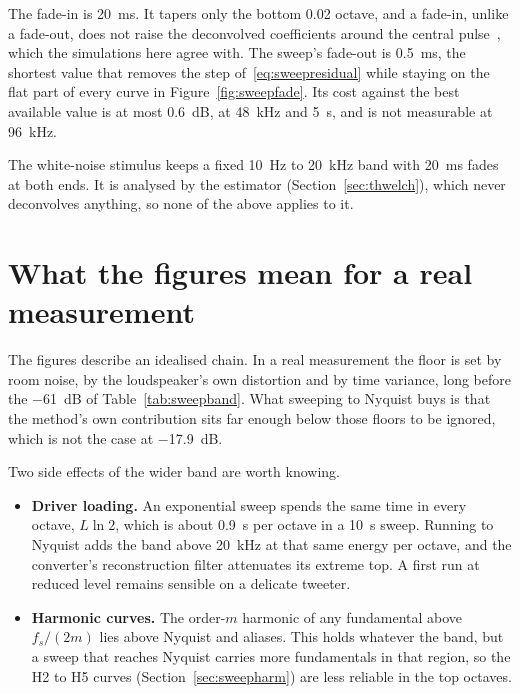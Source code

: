 The fade-in is \SI{20}{\milli\second}. It tapers only the bottom \num{0.02} octave, and a fade-in, unlike a fade-out, does not raise the deconvolved coefficients around the central pulse~\cite{Vetter2011}, which the simulations here agree with. The sweep's fade-out is \SI{0.5}{\milli\second}, the shortest value that removes the step of~\eqref{eq:sweepresidual} while staying on the flat part of every curve in Figure~\ref{fig:sweepfade}. Its cost against the best available value is at most \SI{0.6}{\dB}, at \SI{48}{\kilo\hertz} and \SI{5}{\second}, and is not measurable at \SI{96}{\kilo\hertz}.

The white-noise stimulus keeps a fixed \SI{10}{\hertz} to \SI{20}{\kilo\hertz} band with \SI{20}{\milli\second} fades at both ends. It is analysed by the  estimator (Section~\ref{sec:thwelch}), which never deconvolves anything, so none of the above applies to it.

\section{What the figures mean for a real measurement}
The figures describe an idealised chain. In a real measurement the floor is set by room noise, by the loudspeaker's own distortion and by time variance, long before the \SI{-61}{\dB} of Table~\ref{tab:sweepband}. What sweeping to Nyquist buys is that the method's own contribution sits far enough below those floors to be ignored, which is not the case at \SI{-17.9}{\dB}.

Two side effects of the wider band are worth knowing.
\begin{itemize}[nosep]
  \item \textbf{Driver loading.} An exponential sweep spends the same time in every octave, $L \ln 2$, which is about \SI{0.9}{\second} per octave in a \SI{10}{\second} sweep. Running to Nyquist adds the band above \SI{20}{\kilo\hertz} at that same energy per octave, and the converter's reconstruction filter attenuates its extreme top. A first run at reduced level remains sensible on a delicate tweeter.
  \item \textbf{Harmonic curves.} The order-$m$ harmonic of any fundamental above $f_s/(2m)$ lies above Nyquist and aliases. This holds whatever the band, but a sweep that reaches Nyquist carries more fundamentals in that region, so the H2 to H5 curves (Section~\ref{sec:sweepharm}) are less reliable in the top octaves.
\end{itemize}
